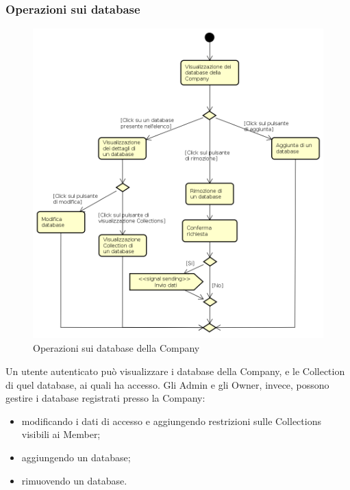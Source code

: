 \subsubsection{Operazioni sui database}
\begin{figure}[H]
\begin{center}
\includegraphics[height=12cm]{res/sections/backend/activities/gestioneDatabase.png}
\caption{Operazioni sui database della Company}
\end{center}
\end{figure}
Un utente autenticato può visualizzare i database della Company, e le Collection di quel database, ai quali ha accesso. Gli Admin e gli Owner, invece, possono gestire i database registrati presso la Company:
\begin{itemize}
\item modificando i dati di accesso e aggiungendo restrizioni sulle Collections visibili ai Member;
\item aggiungendo un database;
\item rimuovendo un database.
\end{itemize} 
\newpage
